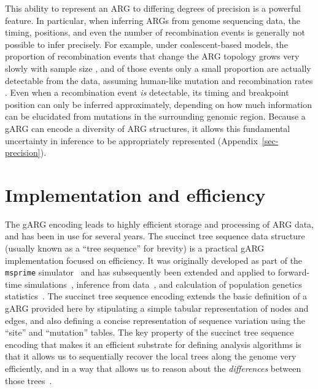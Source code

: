 \documentclass{article}
\begin{document}
This ability to represent an ARG to differing degrees of precision is a powerful
feature. In particular, when inferring ARGs from genome
sequencing data, the timing, positions, and even the number of recombination
events is generally not possible to infer precisely. For example, under
coalescent-based models, the proportion of recombination events that change the
ARG topology grows very slowly with sample size \citep{hein2004gene}, and of those
events only a small proportion are actually detectable from the data, assuming
human-like mutation and recombination
rates \citep{myers2002detection,hayman2023recoverability}.
Even when a recombination event \emph{is} detectable, its timing and breakpoint
position can only be inferred approximately, depending on how much information
can be elucidated from mutations in the surrounding genomic region. Because a gARG
can encode a diversity of ARG structures, it
allows this fundamental uncertainty in inference to be appropriately represented
(Appendix~\ref{sec-precision}).


\section{Implementation and efficiency}
\label{sec-efficiency}
The gARG encoding leads to highly efficient storage and processing of ARG data,
and has been in use for several years.
The succinct tree sequence data structure
(usually known as a ``tree sequence'' for brevity)
is a practical gARG implementation focused on efficiency.
It was originally developed as part of the \texttt{msprime}
simulator~\citep{kelleher2016efficient} and has subsequently been
extended and applied to forward-time
simulations~\citep{kelleher2018efficient,haller2018tree},
inference from
data~\citep{kelleher2019inferring,wohns2022unified,zhan2023towards},
and calculation of population genetics statistics~\citep{ralph2020efficiently}.
The succinct tree sequence encoding extends the basic definition
of a gARG provided here by stipulating a
simple tabular representation of nodes and edges,
and also defining a concise representation of
sequence variation using the ``site'' and  ``mutation'' tables.
The key property of the succinct tree sequence encoding
that makes it an efficient substrate for defining analysis
algorithms is that it allows us to sequentially
recover the local trees along the genome very efficiently,
and in a way that allows us to reason about the \emph{differences}
between those trees~\citep{kelleher2016efficient,ralph2020efficiently}.
\end{document}
